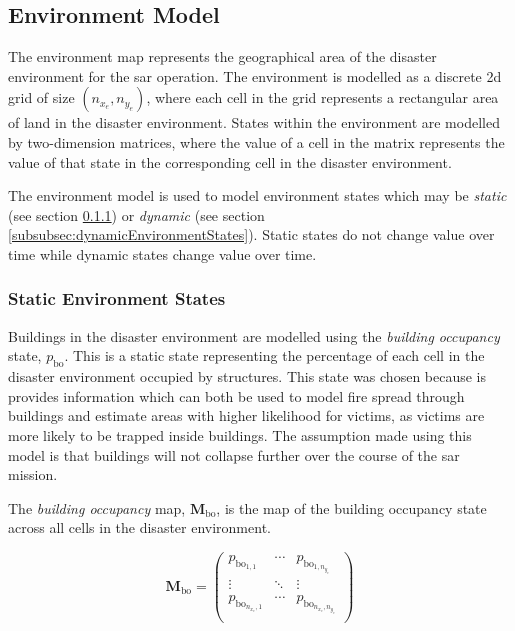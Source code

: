 \documentclass[conference]{IEEEtran}
\begin{document}
\subsection{Environment Model} \label{subsec:environmentModel}


The environment map represents the geographical area of the disaster environment for the \gls{sar} operation.
The environment is modelled as a discrete \gls{2d} grid of size $(n_{x_{e}}, n_{y_{e}})$, where each cell in the grid represents a rectangular area of land in the disaster environment.
States within the environment are modelled by two-dimension matrices, where the value of a cell in the matrix represents the value of that state in the corresponding cell in the disaster environment.

The environment model is used to model environment states which may be \textit{static} (see section \ref{subsubsec:staticEnvironmentStates}) or \textit{dynamic} (see section \ref{subsubsec:dynamicEnvironmentStates}).
Static states do not change value over time while dynamic states change value over time.

\subsubsection{Static Environment States} \label{subsubsec:staticEnvironmentStates}

Buildings in the disaster environment are modelled using the \textit{building occupancy} state, $p_{\text{bo}}$.
This is a static state representing the percentage of each cell in the disaster environment occupied by structures.
This state was chosen because is provides information which can both be used to model fire spread through buildings and estimate areas with higher likelihood for victims, as victims are more likely to be trapped inside buildings.
The assumption made using this model is that buildings will not collapse further over the course of the \gls{sar} mission.

The \textit{building occupancy} map, $\bm{M}_{\text{bo}}$, is the map of the building occupancy state across all cells in the disaster environment.

\begin{equation} \label{eq:m_bo}
    \bm{M}_{\text{bo}} = 
    \begin{pmatrix}
        p_{\text{bo}_{1,1}} & \cdots & p_{\text{bo}_{1,n_{y_{e}}}}\\
        \vdots & \ddots & \vdots \\
        p_{\text{bo}_{n_{x_{e}},1}} & \cdots & p_{\text{bo}_{n_{x_{e}},n_{y_{e}}}}\\
    \end{pmatrix}
\end{equation}
\end{document}
